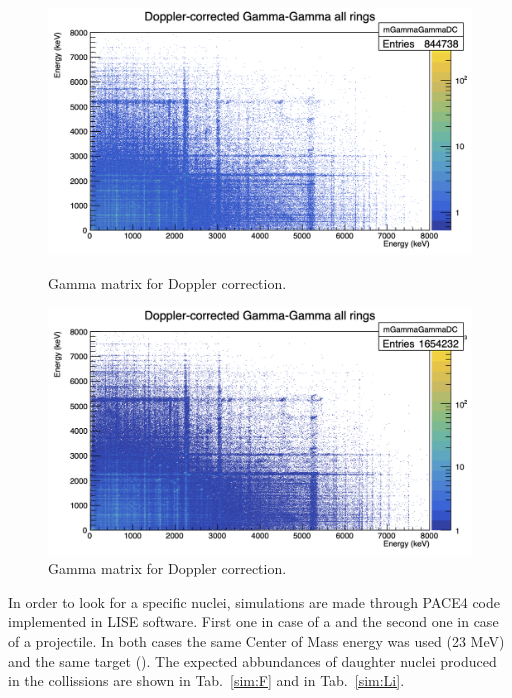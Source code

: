 \begin{figure}[h]
  \centering
  \begin{minipage}[b]{0.45\textwidth}
    \vspace{5mm}
    \includegraphics[width=\textwidth]{img/matrix_F.png}
    \caption{Gamma matrix for  Doppler correction.}
    \label{matrix:F}
  \end{minipage}
  \hfill
  \begin{minipage}[b]{0.45\textwidth}
    \vspace{5mm}
    \includegraphics[width=\textwidth]{img/matrix_Li.png}
    \caption{Gamma matrix for  Doppler correction.}
    \label{matrix:Li}
  \end{minipage}
\end{figure}

In order to look for a specific nuclei, simulations are made through PACE4 code
\cite{lise} implemented in LISE software. First one in case of a 
and the second one in case of a  projectile.
In both cases the same Center of Mass energy was used (23 MeV) and
the same target (). The expected abbundances of daughter nuclei
produced in the collissions are shown in Tab.~\ref{sim:F} and in
Tab.~\ref{sim:Li}.

